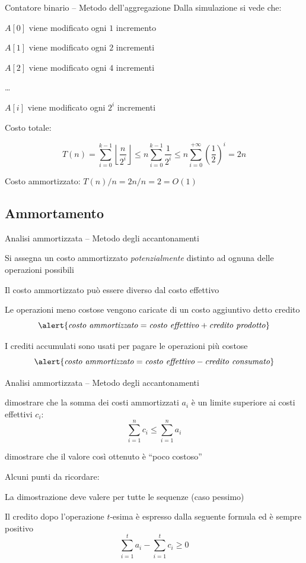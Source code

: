 \begin{frame}{Contatore binario -- Metodo dell'aggregazione}	
Dalla simulazione si vede che:
\BI
\item $A[0]$ viene modificato ogni $1$ incremento
\item $A[1]$ viene modificato ogni $2$ incrementi
\item $A[2]$ viene modificato ogni $4$ incrementi
\item \ldots
\item $A[i]$ viene modificato ogni $2^i$ incrementi
\EI
\begin{myboxtitle}
\BI 
\item Costo totale:
\parbox[c]{8cm}{
\[
T(n) = \sum_{i=0}^{k-1} \left\lfloor \frac{n}{2^i} \right\rfloor \leq n \sum_{i=0}^{k-1}  \frac{1}{2^i} \leq n \sum_{i=0}^{+\infty}  \left(\frac{1}{2}\right)^i = 2n
\]
}
\item Costo ammortizzato: $T(n)/n = 2n/n = 2  = O(1)$
\EI
\end{myboxtitle}
\end{frame}

\subsection{Ammortamento}

\begin{frame}{Analisi ammortizzata -- Metodo degli accantonamenti}
\BI
\item Si assegna un costo ammortizzato \emph{potenzialmente} distinto ad ognuna delle operazioni possibili
\item Il costo ammortizzato può essere diverso dal costo effettivo
\BI
\item Le operazioni meno costose vengono caricate di un costo aggiuntivo detto \alert{credito}
\[
\alert{\mathit{costo\ ammortizzato} = \mathit{costo\ effettivo} + \mathit{credito\ prodotto}}
\]
\item I crediti accumulati sono usati per pagare le operazioni più costose
\[
\alert{\mathit{costo\ ammortizzato} = \mathit{costo\ effettivo} - \mathit{credito\ consumato}}
\]
\EI
\EI
\end{frame}


\begin{frame}{Analisi ammortizzata -- Metodo degli accantonamenti}

\begin{myboxtitle}[Obiettivi]
\BI
\item dimostrare che la somma dei costi ammortizzati $a_i$ è un limite superiore ai costi effettivi $c_i$:
\[
 \sum_{i=1}^n c_i \leq \sum_{i=1}^n a_i
\]
\item  dimostrare che il valore così ottenuto è “poco costoso”
\EI
\end{myboxtitle}

\bigskip
Alcuni punti da ricordare:
\BI
\item La dimostrazione deve valere per tutte le sequenze (caso pessimo)
\item Il credito dopo l'operazione $t$-esima è espresso dalla seguente formula ed è sempre positivo
\EI
\[
 \sum_{i=1}^t a_i - \sum_{i=1}^t c_i \geq 0
\]

\end{frame}

